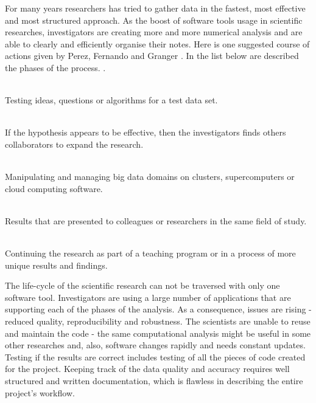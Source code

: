 For many years researchers has tried to gather data in the fastest, most effective and most structured approach. As the boost of software tools usage in scientific researches, investigators are creating more and more numerical analysis and are able to clearly and efficiently organise their notes. Here is one suggested course of actions given by Perez, Fernando and Granger \cite{perez2013open}. In the list below are described the phases of the process. \cite{perez2013open}.

\begin{description}
\label{phases}
\item[Individual exploration] \hfill \\ Testing ideas, questions or algorithms for a test data set.

\item[Collaboration] \hfill \\ If the hypothesis appears to be effective, then the investigators finds others collaborators to expand the research.

\item[Production-scale execution] \hfill \\ Manipulating and managing big data domains on clusters, supercomputers or cloud computing software.

\item[Publication] \hfill \\ Results that are presented to colleagues or researchers in the same field of study.

\item[Education] \hfill \\ Continuing the research as part of a teaching program or in a process of more unique results and findings.
 
\end{description}

The life-cycle of the scientific research can not be traversed with only one software tool. Investigators are using a large number of applications that are supporting each of the phases of the analysis. As a consequence, issues are rising - reduced quality, reproducibility and robustness. The scientists are unable to reuse and maintain the code - the same computational analysis might be useful in some other researches and, also, software changes rapidly and needs constant updates. Testing if the results are correct includes testing of all the pieces of code created for the project. Keeping track of the data quality and accuracy requires well structured and written documentation, which is flawless in describing the entire project's workflow. 

